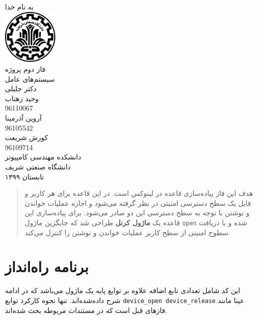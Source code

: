 \documentclass[13pt]{article}
\begin{document}
\fontsize{13}{14}\selectfont
\begin{titlepage}
	\centering
	\large{به نام خدا}\\
	[2cm]
	\includegraphics[width=0.2\textwidth]{sharif-logo-fa.png}\\
	[1.5cm]
	\Huge{
		فاز دوم پروژه
	}\\[2.5cm]
	
	\huge{سیستم‌های عامل\\
	دکتر جلیلی
	}\\
	[2cm]
	\Large{
	وحید زهتاب}\\
	\large{96110067}\\
\Large{
	آروین آذرمینا}\\
\large{96105542}\\
	\Large{
	کورش شریعت}\\
	\large{96109714}\\[2.5cm]
	\large{دانشکده مهندسی کامپیوتر\\دانشگاه صنعتی شریف\\{تابستان ۱۳۹۹}}
\end{titlepage}
\begin{abstract}
	هدف این فاز پیاده‌سازی قاعده 
	 در لینوکس است. در این  قاعده برای هر کاربر و فایل یک سطح دسترسی امنیتی در نظر گرفته می‌شود و اجازه عملیات‌ خواندن و نوشتن با توجه به سطح دسترسی این دو صادر می‌شود. برای پیاده‌سازی این قاعده یک \textbf{ماژول کرنل} طراحی شد که جایگزین ماژول \texttt{open} شده و با دریافت سطوح امنیتی از سطح کاربر عملیات خواندن و نوشتن را کنترل می‌کند.
\end{abstract}
\hrulefill
\section{برنامه راه‌انداز}
	این کد شامل تعدادی تابع اضافه علاوه بر توابع پایه یک ماژول می‌باشد که در ادامه  شرح داده‌شده‌اند. تنها نحوه کارکرد توابع
\texttt{device\_open device\_release}
	عینا مانند فازهای قبل است که در مستندات مربوطه بحث شده‌اند.
\end{document}
